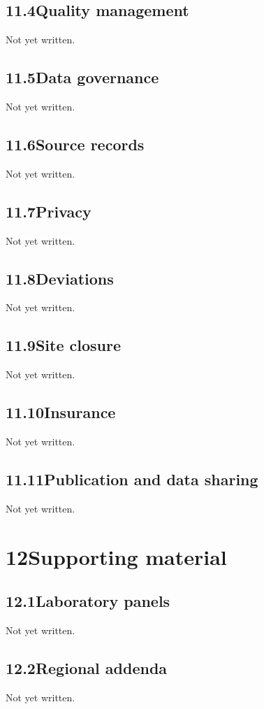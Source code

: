 \documentclass[11pt,a4paper]{article}
\newcommand{\psnote}[2]{\par\noindent\colorbox{#1!8}{\parbox{\dimexpr\linewidth-2\fboxsep}{\small\color{#1}#2}}\par}
\begin{document}
\subsection{11.4\quad Quality management}\label{section.11.4}
\psnote{pswarn}{Not yet written.}
\subsection{11.5\quad Data governance}\label{section.11.5}
\psnote{pswarn}{Not yet written.}
\subsection{11.6\quad Source records}\label{section.11.6}
\psnote{pswarn}{Not yet written.}
\subsection{11.7\quad Privacy}\label{section.11.7}
\psnote{pswarn}{Not yet written.}
\subsection{11.8\quad Deviations}\label{section.11.8}
\psnote{pswarn}{Not yet written.}
\subsection{11.9\quad Site closure}\label{section.11.9}
\psnote{pswarn}{Not yet written.}
\subsection{11.10\quad Insurance}\label{section.11.10}
\psnote{pswarn}{Not yet written.}
\subsection{11.11\quad Publication and data sharing}\label{section.11.11}
\psnote{pswarn}{Not yet written.}
\section{12\quad Supporting material}\label{section.12}
\subsection{12.1\quad Laboratory panels}\label{section.12.1}
\psnote{pswarn}{Not yet written.}
\subsection{12.2\quad Regional addenda}\label{section.12.2}
\psnote{pswarn}{Not yet written.}
\end{document}
